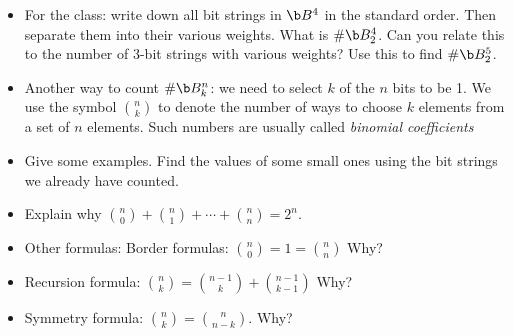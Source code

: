 \begin{itemize}
\item For the class: write down all bit strings in $\b B^4$ in the standard order.  Then separate them into their various weights.  What is $\#\b B^4_2$.  Can you relate this to the number of 3-bit strings with various weights?  Use this to find $\#\b B^5_2$.

\item Another way to count $\#\b B^n_k$: we need to select $k$ of the $n$ bits to be 1.  We use the symbol ${n \choose k}$ to denote the number of ways to choose $k$ elements from a set of $n$ elements.  Such numbers are usually called {\em binomial coefficients}

\item Give some examples.  Find the values of some small ones using the bit strings we already have counted.

\item Explain why ${n \choose 0 } + {n \choose 1} + \cdots + {n \choose n} = 2^n$.

\item Other formulas: Border formulas: ${n \choose 0} = 1 = {n \choose n}$  Why?  
\item Recursion formula: ${n \choose k}  = {n-1 \choose k} + {n-1 \choose k-1}$  Why?
\item Symmetry formula: ${n \choose k} = {n \choose n-k}$.  Why?
\end{itemize}



